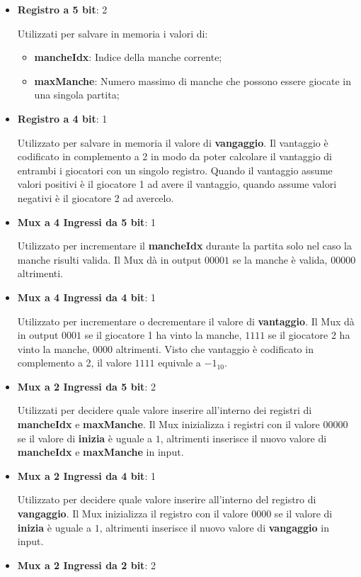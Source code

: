 \documentclass[a4paper]{article}
\begin{document}
\begin{itemize}
	\item \textbf{Registro a 5 bit}: 2

	      \noindent Utilizzati per salvare in memoria i valori di:
	      \begin{itemize}
		      \item \textbf{mancheIdx}: Indice della manche corrente;
		      \item \textbf{maxManche}: Numero massimo di manche che possono essere giocate in una singola partita;
	      \end{itemize}
	\item \textbf{Registro a 4 bit}: 1

	      \noindent Utilizzato per salvare in memoria il valore di \textbf{vangaggio}. Il vantaggio è codificato in complemento
	      a 2 in modo da poter calcolare il vantaggio di entrambi i giocatori con un singolo registro. Quando il
	      vantaggio assume valori positivi è il giocatore 1 ad avere il vantaggio, quando assume valori negativi
	      è il giocatore 2 ad avercelo.
	\item \textbf{Mux a 4 Ingressi da 5 bit}: 1

	      \noindent Utilizzato per incrementare il \textbf{mancheIdx} durante la partita solo nel caso la manche
	      risulti valida. Il Mux dà in output \( 00001 \) se la manche è valida, \( 00000 \) altrimenti.
	\item \textbf{Mux a 4 Ingressi da 4 bit}: 1

	      \noindent Utilizzato per incrementare o decrementare il valore di \textbf{vantaggio}. Il Mux dà in output
	      \( 0001 \) se il giocatore 1 ha vinto la manche, \( 1111 \) se il giocatore 2 ha vinto la manche,
	      \( 0000 \) altrimenti. Visto che vantaggio è codificato in complemento a 2, il valore \( 1111 \) equivale
	      a \( -1_{10} \).
	\item \textbf{Mux a 2 Ingressi da 5 bit}: 2

	      \noindent Utilizzati per decidere quale valore inserire all'interno dei registri di \textbf{mancheIdx}
	      e \textbf{maxManche}. Il Mux inizializza i registri con il valore \( 00000 \) se il valore di \textbf{inizia}
	      è uguale a \( 1 \), altrimenti inserisce il nuovo valore di \textbf{mancheIdx} e \textbf{maxManche} in input.
	\item \textbf{Mux a 2 Ingressi da 4 bit}: 1

	      \noindent Utilizzato per decidere quale valore inserire all'interno del registro di \textbf{vangaggio}.
	      Il Mux inizializza il registro con il valore \( 0000 \) se il valore di \textbf{inizia} è uguale a \( 1 \),
	      altrimenti inserisce il nuovo valore di \textbf{vangaggio} in input.
	\item \textbf{Mux a 2 Ingressi da 2 bit}: 2


\end{itemize}
\end{document}
